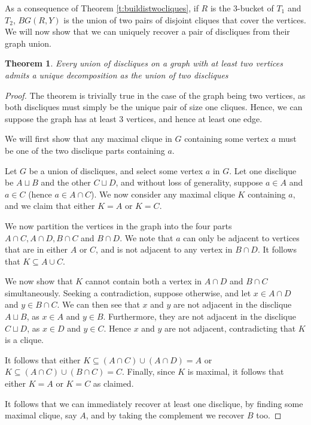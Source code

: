 \documentclass[12pt]{article}
\newtheorem{Theorem}{Theorem}[section]
\theoremstyle{definition}
\begin{document}
As a consequence of Theorem \ref{t:buildistwocliques}, if $R$ is the $3$-bucket of $T_1$ and $T_2$, $BG(R,Y)$ is the union of two pairs of disjoint cliques that cover the vertices. We will now show that we can uniquely recover a pair of discliques from their graph union.

\begin{Theorem}
    Every union of discliques on a graph with at least two vertices admits a unique decomposition as the union of two discliques
\end{Theorem} 

\begin{proof}
    The theorem is trivially true in the case of the graph being two vertices, as both discliques must simply be the unique pair of size one cliques. Hence, we can suppose the graph has at least $3$ vertices, and hence at least one edge.

    We will first show that any maximal clique in $G$ containing some vertex $a$ must be one of the two disclique parts containing $a$.
    
    Let $G$ be a union of discliques, and select some vertex $a$ in $G$. Let one disclique be $A \sqcup B$ and the other $C \sqcup D$, and without loss of generality, suppose $a \in A$ and $a \in C$ (hence $a \in A \cap C$). We now consider any maximal clique $K$ containing $a$, and we claim that either $K=A$ or $K=C$. 

    We now partition the vertices in the graph into the four parts $A \cap C, A \cap D, B \cap C$ and $B \cap D$. We note that $a$ can only be adjacent to vertices that are in either $A$ or $C$, and is not adjacent to any vertex in $B \cap D$. It follows that $K \subseteq A \cup C$.

    We now show that $K$ cannot contain both a vertex in $A \cap D$ and $B \cap C$ simultaneously. Seeking a contradiction, suppose otherwise, and let $x \in A \cap D$ and $y \in B \cap C$. We can then see that $x$ and $y$ are not adjacent in the disclique $A \sqcup B$, as $x \in A$ and $y \in B$. Furthermore, they are not adjacent in the disclique $C \sqcup D$, as $x \in D$ and $y \in C$. Hence $x$ and $y$ are not adjacent, contradicting that $K$ is a clique.

    It follows that either $K \subseteq (A\cap C) \cup (A \cap D) = A$ or $K \subseteq (A \cap C) \cup (B \cap C) = C$. Finally, since $K$ is maximal, it follows that either $K = A$ or $K= C$ as claimed.

    It follows that we can immediately recover at least one disclique, by finding some maximal clique, say $A$, and by taking the complement we recover $B$ too.


\end{proof}
\end{document}

